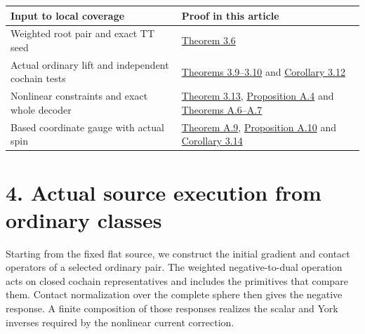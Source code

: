 \documentclass[
  english,
  11pt,
  reqno]{amsart}
\newcounter{none} %
\begin{document}
{\def\LTcaptype{none} %
\begin{longtable}[]{@{}
  >{\raggedright\arraybackslash}p{}
  >{\raggedright\arraybackslash}p{}@{}}
\toprule\noalign{}
\begin{minipage}[b]{\linewidth}\raggedright
Input to local coverage
\end{minipage} & \begin{minipage}[b]{\linewidth}\raggedright
Proof in this article
\end{minipage} \\
\midrule\noalign{}
\endhead
\bottomrule\noalign{}
\endlastfoot
Weighted root pair and exact TT seed &
\hyperref[thm:online-root-seed-isomorphism]{Theorem 3.6} \\
Actual ordinary lift and independent cochain tests &
\hyperref[thm:online-canonical-actual-pair-lift]{Theorems 3.9--3.10} and
\hyperref[cor:online-effective-ordinary-class-identification]{Corollary
3.12} \\
Nonlinear constraints and exact whole decoder &
\hyperref[thm:online-ordinary-pair-data-bijection]{Theorem 3.13},
\hyperref[prop:online-chart-exact-ambient-decoder]{Proposition A.4} and
\hyperref[thm:online-chart-base-constraint-bijection]{Theorems
A.6--A.7} \\
Based coordinate gauge with actual spin &
\hyperref[thm:online-gauge-based-normalization]{Theorem A.9},
\hyperref[prop:online-gauge-rotation-and-spin]{Proposition A.10} and
\hyperref[cor:online-ordinary-pair-ungauged-access]{Corollary 3.14} \\
\end{longtable}
}

\section{4. Actual source execution from ordinary
classes}\label{actual-source-execution-from-ordinary-classes}\label{sec:online-actual-source-execution}

Starting from the fixed flat source, we construct the initial gradient
and contact operators of a selected ordinary pair. The weighted
negative-to-dual operation acts on closed cochain representatives and
includes the primitives that compare them. Contact normalization over
the complete sphere then gives the negative response. A finite
composition of those responses realizes the scalar and York inverses
required by the nonlinear current correction.
\end{document}
